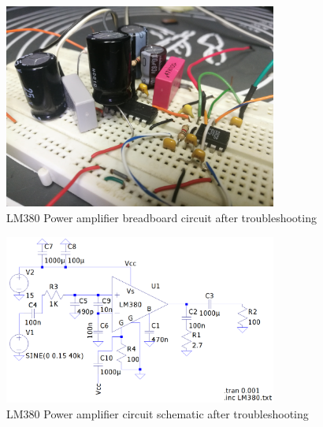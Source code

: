 \begin{figure}[ht!]
    \centering
    \includegraphics[width=0.8\textwidth]{Figures/Implementation/Amplifier/ampbbcirc.jpg}
    \caption{LM380 Power amplifier breadboard circuit after troubleshooting}
    \label{fig:ampbbCirc}
\end{figure}

\begin{figure}[ht!]
    \centering
    \includegraphics[width=0.8\textwidth]{Figures/Implementation/Amplifier/Lm380Mod.png}
    \caption{LM380 Power amplifier circuit schematic after troubleshooting}
    \label{fig:ampCircPosttbl}
\end{figure}

